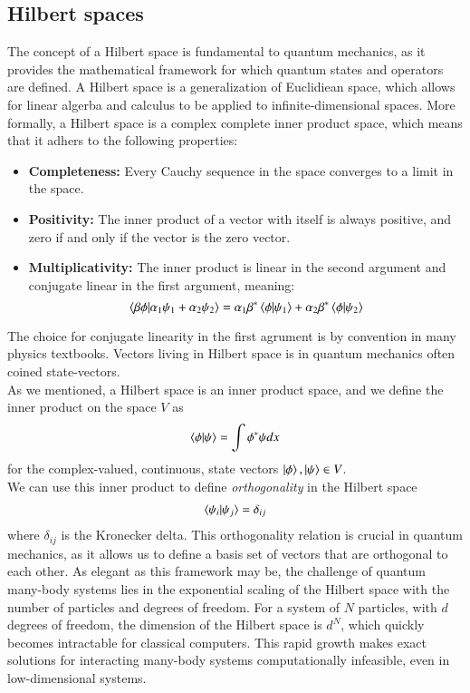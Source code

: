 \documentclass{subfiles}
\begin{document}
\subsection*{Hilbert spaces}\label{sec:Hilbert_space}
The concept of a Hilbert space is fundamental to quantum mechanics, as it provides the mathematical framework for which quantum states and operators are defined. A Hilbert space is a generalization of Euclidiean space, which allows for linear algerba and calculus to be applied to infinite-dimensional spaces. More formally, a Hilbert space is a complex complete inner product space, which means that it adhers to the following properties:
\begin{itemize}
    \item \textbf{Completeness:} Every Cauchy sequence in the space converges to a limit in the space.
    \item \textbf{Positivity:} The inner product of a vector with itself is always positive, and zero if and only if the vector is the zero vector.
    \item \textbf{Multiplicativity:} The inner product is linear in the second argument and conjugate linear in the first argument, meaning:
    \begin{equation}
        \braket{\beta\phi|\alpha_1\psi_1 + \alpha_2\psi_2} = \alpha_1\beta^*\braket{\phi|\psi_1} + \alpha_2\beta^*\braket{\phi|\psi_2} 
    \end{equation}
\end{itemize}
The choice for conjugate linearity in the first agrument is by convention in many physics textbooks. Vectors living in Hilbert space is in quantum mechanics often coined state-vectors. \\ As we mentioned, a Hilbert space is an inner product space, and we define the inner product on the space $V$ as
\begin{align*}
    \braket{\phi|\psi} = \int \phi^* \psi dx
\end{align*}
for the complex-valued, continuous, state vectors $\ket{\phi}, \ket{\psi} \in V$. \\ We can use this inner product to define \emph{orthogonality} in the Hilbert space
\begin{align*}
    \braket{\psi_i|\psi_j} = \delta_{ij}
\end{align*}
where $\delta_{ij}$ is the Kronecker delta. This orthogonality relation is crucial in quantum mechanics, as it allows us to define a basis set of vectors that are orthogonal to each other. As elegant as this framework may be, the challenge of quantum many-body systems lies in the exponential scaling of the Hilbert space with the number of particles and degrees of freedom. For a system of $N$ particles, with $d$ degrees of freedom, the dimension of the Hilbert space is $d^N$, which quickly becomes intractable for classical computers. This rapid growth makes exact solutions for interacting many-body systems computationally infeasible, even in low-dimensional systems. 
\end{document}
